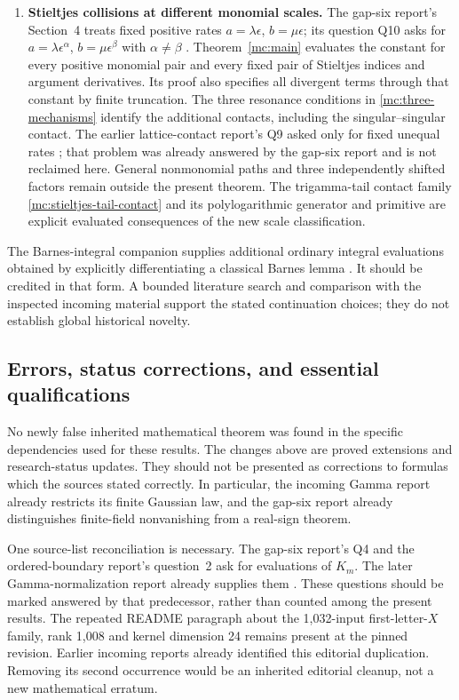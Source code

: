 \documentclass[11pt,a4paper]{article}
\numberwithin{equation}{section}
\theoremstyle{definition}
\theoremstyle{remark}
\begin{document}
\begin{enumerate}
\item \textbf{Stieltjes collisions at different monomial scales.}
The gap-six report's Section~4 treats fixed positive rates
$a=\lambda\epsilon$, $b=\mu\epsilon$; its question Q10 asks for
$a=\lambda\epsilon^\alpha$, $b=\mu\epsilon^\beta$ with
$\alpha\ne\beta$ \cite{GapSix}.
Theorem~\ref{mc:main} evaluates the constant for every positive
monomial pair and every fixed pair of Stieltjes indices and
argument derivatives. Its proof also specifies all divergent
terms through that constant by finite truncation. The three
resonance conditions in \eqref{mc:three-mechanisms} identify the
additional contacts, including the singular--singular contact.
The earlier lattice-contact report's Q9 asked only for fixed
unequal rates \cite{LatticeIncoming}; that problem was already
answered by the gap-six report and is not reclaimed here.
General nonmonomial paths and three independently shifted factors
remain outside the present theorem. The trigamma-tail contact
family \eqref{mc:stieltjes-tail-contact} and its polylogarithmic
generator and primitive are explicit evaluated consequences of
the new scale classification.
\end{enumerate}

The Barnes-integral companion supplies additional ordinary integral
evaluations obtained by explicitly differentiating a classical Barnes
lemma \cite{DLMF}. It should be credited in that form. A bounded
literature search and comparison with the inspected incoming material
support the stated continuation choices; they do not establish global
historical novelty.

\subsection{Errors, status corrections, and essential qualifications}

No newly false inherited mathematical theorem was found in the
specific dependencies used for these results. The changes above are
proved extensions and research-status updates. They should not be
presented as corrections to formulas which the sources stated correctly.
In particular, the incoming Gamma report already restricts its finite
Gaussian law, and the gap-six report already distinguishes finite-field
nonvanishing from a real-sign theorem.

One source-list reconciliation is necessary. The gap-six report's Q4
and the ordered-boundary report's question~2 ask for evaluations of
$K_m$. The later Gamma-normalization report already supplies them
\cite{GammaIncoming,GapSix,OrderedIncoming}. These questions should be
marked answered by that predecessor, rather than counted among the
present results. The repeated README paragraph about the 1,032-input
first-letter-$X$ family, rank 1,008 and kernel dimension 24 remains
present at the pinned revision. Earlier incoming reports already
identified this editorial duplication. Removing its second occurrence
would be an inherited editorial cleanup, not a new mathematical erratum.
\end{document}
